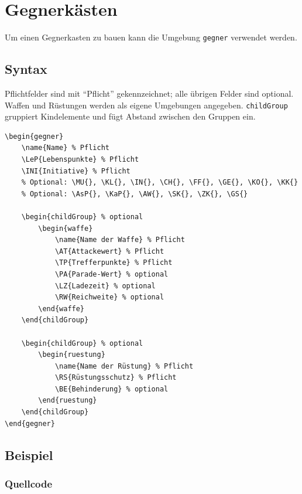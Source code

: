\chapter{Gegnerkästen}

Um einen Gegnerkasten zu bauen kann die Umgebung \texttt{gegner} verwendet werden.

\section{Syntax}

Pflichtfelder sind mit ``Pflicht'' gekennzeichnet; alle übrigen Felder sind
optional. Waffen und Rüstungen werden als eigene Umgebungen angegeben.
\texttt{childGroup} gruppiert Kindelemente und fügt Abstand zwischen den
Gruppen ein.

\begin{verbatim}
\begin{gegner}
    \name{Name} % Pflicht
    \LeP{Lebenspunkte} % Pflicht
    \INI{Initiative} % Pflicht
    % Optional: \MU{}, \KL{}, \IN{}, \CH{}, \FF{}, \GE{}, \KO{}, \KK{}
    % Optional: \AsP{}, \KaP{}, \AW{}, \SK{}, \ZK{}, \GS{}

    \begin{childGroup} % optional
        \begin{waffe}
            \name{Name der Waffe} % Pflicht
            \AT{Attackewert} % Pflicht
            \TP{Trefferpunkte} % Pflicht
            \PA{Parade-Wert} % optional
            \LZ{Ladezeit} % optional
            \RW{Reichweite} % optional
        \end{waffe}
    \end{childGroup}

    \begin{childGroup} % optional
        \begin{ruestung}
            \name{Name der Rüstung} % Pflicht
            \RS{Rüstungsschutz} % Pflicht
            \BE{Behinderung} % optional
        \end{ruestung}
    \end{childGroup}
\end{gegner}
\end{verbatim}

\section{Beispiel}

\subsection{Quellcode}

